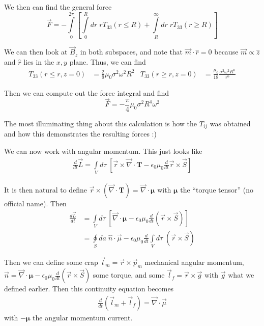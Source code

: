 \documentclass[10pt]{report}
\newcommand{\rd}[2]{\frac{d#1}{d#2}}
\begin{document}
We then can find the general force
\begin{equation}
    \vec{F} = -\int\limits_{0}^{2\pi}\left[\int\limits_{0}^{R}dr\; r T_{33}(r \leq R) + \int\limits_{R}^{\infty}dr\;rT_{33}(r \geq R)\right] \label{4.26.force}
\end{equation}

We can then look at $\vec{B}_z$ in both subspaces, and note that $\vec{m} \cdot \hat{r} = 0$ because $\vec{m} \propto \hat{z}$ and $\hat{r}$ lies in the $x,y$ plane. Thus, we can find
\begin{align}
    T_{33}(r \leq r, z = 0) &= \frac{2}{9}\mu_0 \sigma^2 \omega^2 R^2 & T_{33}(r \geq r, z = 0) &= \frac{\mu_0}{18}\frac{\sigma^2 \omega^2 R^8}{r^6}
\end{align}

Then we can compute out the force integral and find
\begin{equation}
    \vec{F} = -\frac{\pi}{4}\mu_0 \sigma^2 R^4 \omega^2
\end{equation}

The most illuminating thing about this calculation is how the $T_{ij}$ was obtained and how this demonstrates the resulting forces :)

We can now work with angular momentum. This just looks like
\begin{align}
    \rd{}{t}\vec{L} = \int\limits_{V}^{}d\tau\;\left[ \vec{r} \times \vec{\nabla}\cdot \mathbf{T} - \epsilon_0 \mu_0 \rd{}{t}\vec{r} \times \vec{S} \right]
\end{align}

It is then natural to define $\vec{r} \times \left( \vec{\nabla} \cdot \mathbf{T} \right) = \vec{\nabla} \cdot \mathbf{\mu}$ with $\mathbf{\mu}$ the ``torque tensor'' (no official name). Then
\begin{align}
    \rd{\vec{L}}{t} &= \int\limits_{V}^{}d\tau\;\left[ \vec{\nabla} \cdot \mathbf{\mu} - \epsilon_0 \mu_0 \rd{}{t}(\vec{r} \times \vec{S}) \right]\\
    &= \oint\limits_{S}^{}da\;\hat{n} \cdot \vec{\mu} - \epsilon_0 \mu_0 \rd{}{t}\int\limits_{V}^{}d\tau\;(\vec{r} \times \vec{S})
\end{align}

Then we can define some crap $\vec{l}_m = \vec{r} \times \vec{p}_m$ mechanical angular momentum, $\vec{n} = \vec{\nabla} \cdot \mathbf{\mu} - \epsilon_0 \mu_0 \rd{}{t}(\vec{r} \times \vec{S})$ some torque, and some $\vec{l}_f = \vec{r} \times \vec{g}$ with $\vec{g}$ what we defined earlier. Then this continuity equation becomes
\begin{align}
    \rd{}{t}\left( \vec{l}_m + \vec{l}_f \right) = \vec{\nabla} \cdot \vec{\mu}
\end{align}
with $-\mathbf{\mu}$ the angular momentum current.
\end{document}
